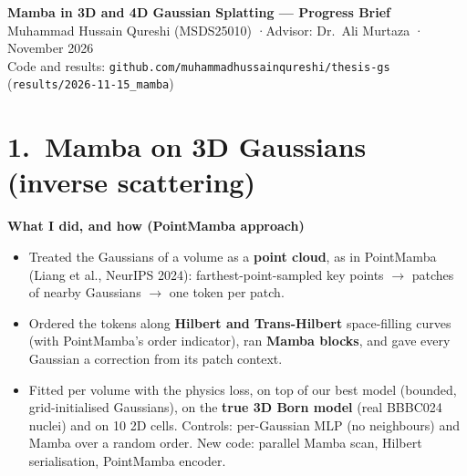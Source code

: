 \documentclass[10pt,a4paper]{article}
\newcommand{\sub}[1]{\par\smallskip\noindent\textbf{#1}\par}
\begin{document}
\begin{center}
{\Large\bfseries Mamba in 3D and 4D Gaussian Splatting --- Progress Brief}\\[2pt]
Muhammad Hussain Qureshi (MSDS25010) \quad·\quad Advisor: Dr.\ Ali Murtaza \quad· November 2026\\
Code and results: \texttt{github.com/muhammadhussainqureshi/thesis-gs} (\texttt{results/2026-11-15\_mamba})
\end{center}

\section*{1.\ Mamba on 3D Gaussians (inverse scattering)}
\sub{What I did, and how (PointMamba approach)}
\begin{itemize}
\item Treated the Gaussians of a volume as a \textbf{point cloud}, as in PointMamba (Liang et al., NeurIPS 2024):
farthest-point-sampled key points $\to$ patches of nearby Gaussians $\to$ one token per patch.
\item Ordered the tokens along \textbf{Hilbert and Trans-Hilbert} space-filling curves (with PointMamba's order
indicator), ran \textbf{Mamba blocks}, and gave every Gaussian a correction from its patch context.
\item Fitted per volume with the physics loss, on top of our best model (bounded, grid-initialised Gaussians), on the
\textbf{true 3D Born model} (real BBBC024 nuclei) and on 10 2D cells. Controls: per-Gaussian MLP (no neighbours) and
Mamba over a random order. New code: parallel Mamba scan, Hilbert serialisation, PointMamba encoder.
\end{itemize}
\end{document}
